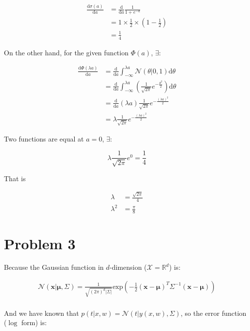 \documentclass[twoside,11pt]{homework}
\newcommand{\vect}[1]{\boldsymbol{\mathbf{#1}}}
\begin{document}
\begin{align*}
\frac{\mathrm{d} \sigma(a)}{\mathrm{d}a} &= \frac{\mathrm{d} }{\mathrm{d}a} \frac{1}{1 + e^{-a}} \\
&= 1 \times \frac{1}{2} \times (1 - \frac{1}{2}) \\
&= \frac{1}{4}
\end{align*}

On the other hand, for the given function $\Phi (a)$, $\exists$:

\begin{align*}
\frac{\mathrm{d} \Phi(\lambda a)}{\mathrm{d}a} &= \frac{\mathrm{d} }{\mathrm{d}a} \int_{- \infty}^{\lambda a} \mathcal{N} (\theta | 0, 1) \mathrm{d} \theta \\
&= \frac{\mathrm{d} }{\mathrm{d}a} \int_{- \infty}^{\lambda a} \left( \frac{1}{\sqrt{2 \pi}} e^{- \frac{\theta^2}{2}} \right) \mathrm{d} \theta \\
&= \frac{\mathrm{d} }{\mathrm{d}a} (\lambda a)  \frac{1}{\sqrt{2 \pi}} e^{- \frac{(\lambda a) ^2}{2}} \\
&= \lambda \frac{1}{\sqrt{2 \pi}} e^{- \frac{(\lambda a) ^2}{2}}
\end{align*}

Two functions are equal at $a=0$, $\exists$:

$$
\lambda \frac{1}{\sqrt{2 \pi}} e^0 = \frac{1}{4}
$$ 

That is 

\begin{align*}
\lambda &= \frac{\sqrt{2 \pi}}{4} \\
\lambda^2 &= \frac{\pi}{8}
\end{align*}

\section*{Problem 3}



Because the Gaussian function in $d$-dimension ($\mathcal{X} = \mathbb{R}^d$) is:

\begin{align*}
\mathcal{N}(\vect{x} | \vect{\mu}, \vect{\varSigma})  = \frac{1}{\sqrt{(2\pi)^d | \vect{\varSigma} |}} \mathrm{exp}{ \left( -\frac{1}{2} (\vect{x}- \vect{\mu})^T \vect{\varSigma}^{-1} (\vect{x} - \vect{\mu}) \right)}\\
\end{align*}

And we have known that $p(t | x, w) = \mathcal{N} ( t | y(x, w), \Sigma)  $,  so the error function ($\log$ form) is:
\end{document}
